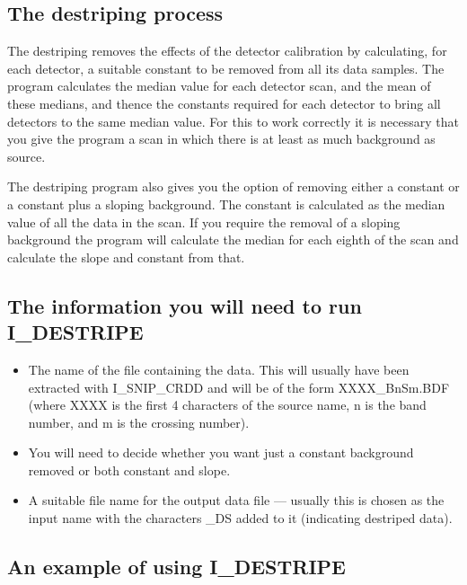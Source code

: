 \documentclass[nolof,noabs,11pt]{starlink}
\begin{document}
\subsection {The destriping process}

The destriping removes the effects of the detector calibration by calculating,
for each detector, a suitable constant to be removed from all its data samples.
The program calculates the median value for each detector scan, and the mean of
these medians, and thence the constants required for each detector to bring all
detectors to the same median value. For this to work correctly it is necessary
that you give the program a scan in which there is at least as much background
as source.

The destriping program also gives you the option of removing either a constant
or a constant plus a sloping background. The constant is calculated as the
median value of all the data in the scan. If you require the removal of a
sloping background the program will calculate the median for each eighth of the
scan and calculate the slope and constant from that.

\subsection {The information you will need to run I\_DESTRIPE}

\begin {itemize}

\item The name of the file containing the data. This will usually have been
extracted with I\_SNIP\_CRDD and will be of the form XXXX\_BnSm.BDF
(where XXXX is the first 4 characters of the source name, n is the band
number, and m is the crossing number).

\item You will need to decide whether you want just a constant background
removed or both constant and slope.

\item A suitable file name for the output data file --- usually this is chosen
as the input name with the characters \_DS added to it (indicating
destriped data).
\end {itemize}

\subsection {An example of using I\_DESTRIPE}
\end{document}

